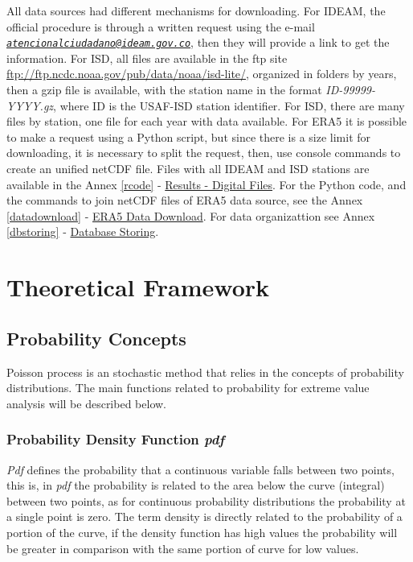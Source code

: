 \documentclass[12pt,oneside]{reedthesis}
\begin{document}
All data sources had different mechanisms for downloading. For IDEAM, the official procedure is through a written request using the e-mail \emph{\href{mailto:atencionalciudadano@ideam.gov.co}{\nolinkurl{atencionalciudadano@ideam.gov.co}}}, then they will provide a link to get the information. For ISD, all files are available in the ftp site \url{ftp://ftp.ncdc.noaa.gov/pub/data/noaa/isd-lite/}, organized in folders by years, then a gzip file is available, with the station name in the format \emph{ID-99999-YYYY.gz}, where ID is the USAF-ISD station identifier. For ISD, there are many files by station, one file for each year with data available. For ERA5 it is possible to make a request using a Python script, but since there is a size limit for downloading, it is necessary to split the request, then, use console commands to create an unified netCDF file. Files with all IDEAM and ISD stations are available in the Annex \ref{rcode} - \protect\hyperlink{results}{Results - Digital Files}. For the Python code, and the commands to join netCDF files of ERA5 data source, see the Annex \ref{datadownload} - \protect\hyperlink{datadownload}{ERA5 Data Download}. For data organizattion see Annex \ref{dbstoring} - \protect\hyperlink{dbstoring}{Database Storing}.

\clearpage

\hypertarget{rmd-thefra}{%
\chapter{Theoretical Framework}\label{rmd-thefra}}

\hypertarget{probability-concepts}{%
\section{Probability Concepts}\label{probability-concepts}}

Poisson process is an stochastic method that relies in the concepts of probability distributions. The main functions related to probability for extreme value analysis will be described below.

\hypertarget{probability-density-function-pdf}{%
\subsection{\texorpdfstring{Probability Density Function \emph{pdf}}{Probability Density Function pdf}}\label{probability-density-function-pdf}}

\emph{Pdf} defines the probability that a continuous variable falls between two points, this is, in \emph{pdf} the probability is related to the area below the curve (integral) between two points, as for continuous probability distributions the probability at a single point is zero. The term density is directly related to the probability of a portion of the curve, if the density function has high values the probability will be greater in comparison with the same portion of curve for low values.
\end{document}
